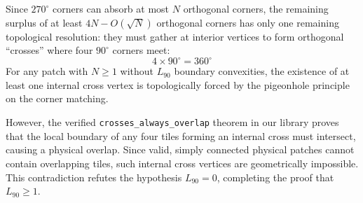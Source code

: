 \documentclass[11pt, a4paper]{amsart}
\begin{document}
Since $270^\circ$ corners can absorb at most $N$ orthogonal corners, the remaining surplus of at least $4N - O(\sqrt{N})$ orthogonal corners has only one remaining topological resolution: they must gather at interior vertices to form orthogonal ``crosses'' where four $90^\circ$ corners meet:
\begin{equation}
4 \times 90^\circ = 360^\circ
\end{equation}
For any patch with $N \ge 1$ without $L_{90}$ boundary convexities, the existence of at least one internal cross vertex is topologically forced by the pigeonhole principle on the corner matching.

However, the verified \texttt{crosses\_always\_overlap} theorem in our library proves that the local boundary of any four tiles forming an internal cross must intersect, causing a physical overlap. Since valid, simply connected physical patches cannot contain overlapping tiles, such internal cross vertices are geometrically impossible. This contradiction refutes the hypothesis $L_{90} = 0$, completing the proof that $L_{90} \ge 1$.
\end{document}
